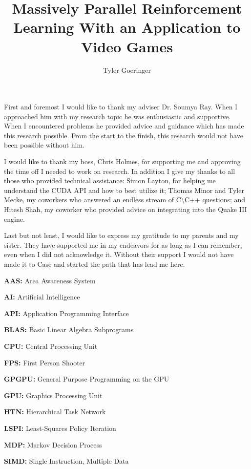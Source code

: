 \clearpage{}

\title{Massively Parallel Reinforcement Learning With an Application to Video Games}
\author{Tyler Goeringer}
\date{}
\maketitle


\committeeapprovalpage

\begin{acknowledgments}
First and foremost I would like to thank my adviser Dr. Soumya Ray. When I approached him with my research topic he was enthusiastic and supportive. When I encountered problems he provided advice and guidance which has made this research possible. From the start to the finish, this research would not have been possible without him.
    
I would like to thank my boss, Chris Holmes, for supporting me and approving the time off I needed to work on research. In addition I give my thanks to all those who provided technical assistance: Simon Layton, for helping me understand the CUDA API and how to best utilize it; Thomas Minor and Tyler Mecke, my coworkers who answered an endless stream of C\textbackslash C++ questions; and Hitesh Shah, my coworker who provided advice on integrating into the Quake III engine.

Last but not least, I would like to express my gratitude to my parents and my sister. They have supported me in my endeavors for as long as I can remember, even when I did not acknowledge it. Without their support I would not have made it to Case and started the path that has lead me here.
\end{acknowledgments}

\tableofcontents
\listoftables
\listoffigures

\begin{abbreviations}
    \textbf{AAS:} Area Awareness System

    \textbf{AI:} Artificial Intelligence

    \textbf{API:} Application Programming Interface
    
    \textbf{BLAS:} Basic Linear Algebra Subprograms
    
    \textbf{CPU:} Central Processing Unit
    
    \textbf{FPS:} First Person Shooter
    
    \textbf{GPGPU:} General Purpose Programming on the GPU
    
    \textbf{GPU:} Graphics Processing Unit
    
    \textbf{HTN:} Hierarchical Task Network
    
    \textbf{LSPI:} Least-Squares Policy Iteration
    
    \textbf{MDP:} Markov Decision Process
    
    \textbf{SIMD:} Single Instruction, Multiple Data
\end{abbreviations}

